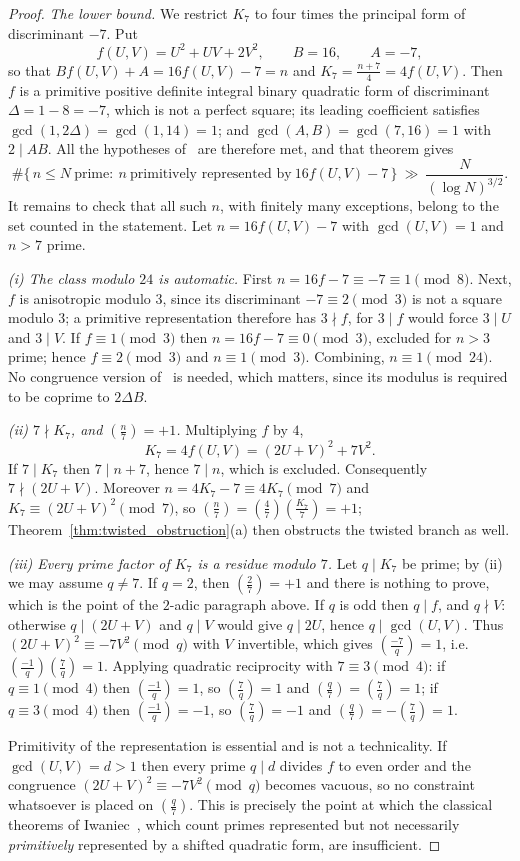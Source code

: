 \documentclass[11pt, a4paper]{article}
\theoremstyle{plain}
\theoremstyle{definition}
\newcommand{\leg}[2]{\left(\frac{#1}{#2}\right)}
\begin{document}
\begin{proof}
\emph{The lower bound.} We restrict $K_7$ to four times the principal form of discriminant $-7$. Put
$$f(U,V)=U^{2}+UV+2V^{2},\qquad B=16,\qquad A=-7,$$
so that $Bf(U,V)+A=16f(U,V)-7=n$ and $K_7=\frac{n+7}{4}=4f(U,V)$. Then $f$ is a primitive positive definite integral binary quadratic form of discriminant $\Delta=1-8=-7$, which is not a perfect square; its leading coefficient satisfies $\gcd(1,2\Delta)=\gcd(1,14)=1$; and $\gcd(A,B)=\gcd(7,16)=1$ with $2\mid AB$. All the hypotheses of~\cite[Thm.~1.1]{fuchs2025} are therefore met, and that theorem gives
$$\#\{\,n\le N\ \text{prime}:\ n\ \text{primitively represented by}\ 16f(U,V)-7\,\}\ \gg\ \frac{N}{(\log N)^{3/2}} .$$
It remains to check that all such $n$, with finitely many exceptions, belong to the set counted in the statement. Let $n=16f(U,V)-7$ with $\gcd(U,V)=1$ and $n>7$ prime.

\emph{(i) The class modulo $24$ is automatic.} First $n=16f-7\equiv-7\equiv1\pmod 8$. Next, $f$ is anisotropic modulo $3$, since its discriminant $-7\equiv2\pmod 3$ is not a square modulo $3$; a primitive representation therefore has $3\nmid f$, for $3\mid f$ would force $3\mid U$ and $3\mid V$. If $f\equiv1\pmod 3$ then $n=16f-7\equiv0\pmod3$, excluded for $n>3$ prime; hence $f\equiv2\pmod3$ and $n\equiv1\pmod 3$. Combining, $n\equiv1\pmod{24}$. No congruence version of~\cite[Thm.~1.1]{fuchs2025} is needed, which matters, since its modulus is required to be coprime to $2\Delta B$.

\emph{(ii) $7\nmid K_7$, and $\leg n7=+1$.} Multiplying $f$ by $4$,
$$K_7=4f(U,V)=(2U+V)^{2}+7V^{2}.$$
If $7\mid K_7$ then $7\mid n+7$, hence $7\mid n$, which is excluded. Consequently $7\nmid(2U+V)$. Moreover $n=4K_7-7\equiv4K_7\pmod 7$ and $K_7\equiv(2U+V)^{2}\pmod7$, so $\leg n7=\leg{4}{7}\leg{K_7}{7}=+1$; Theorem~\ref{thm:twisted_obstruction}(a) then obstructs the twisted branch as well.

\emph{(iii) Every prime factor of $K_7$ is a residue modulo $7$.} Let $q\mid K_7$ be prime; by (ii) we may assume $q\neq7$. If $q=2$, then $\leg27=+1$ and there is nothing to prove, which is the point of the $2$-adic paragraph above. If $q$ is odd then $q\mid f$, and $q\nmid V$: otherwise $q\mid(2U+V)$ and $q\mid V$ would give $q\mid 2U$, hence $q\mid\gcd(U,V)$. Thus $(2U+V)^{2}\equiv-7V^{2}\pmod q$ with $V$ invertible, which gives $\leg{-7}{q}=1$, i.e. $\leg{-1}q\leg7q=1$. Applying quadratic reciprocity with $7\equiv3\pmod4$: if $q\equiv1\pmod4$ then $\leg{-1}q=1$, so $\leg7q=1$ and $\leg q7=\leg7q=1$; if $q\equiv3\pmod4$ then $\leg{-1}q=-1$, so $\leg7q=-1$ and $\leg q7=-\leg7q=1$.

Primitivity of the representation is essential and is not a technicality. If $\gcd(U,V)=d>1$ then every prime $q\mid d$ divides $f$ to even order and the congruence $(2U+V)^{2}\equiv-7V^{2}\pmod q$ becomes vacuous, so no constraint whatsoever is placed on $\leg q7$. This is precisely the point at which the classical theorems of Iwaniec~\cite{iwaniec1972,iwaniec1974}, which count primes represented but not necessarily \emph{primitively} represented by a shifted quadratic form, are insufficient.
\end{proof}
\end{document}

